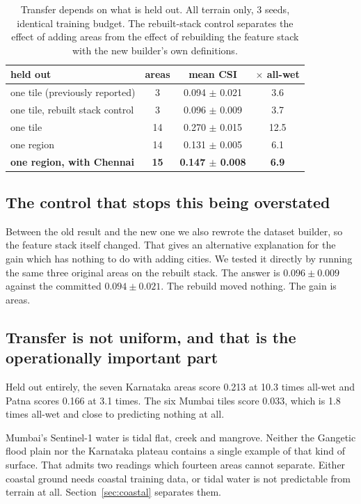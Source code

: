 \begin{table}[!t]
\centering
\caption{Transfer depends on what is held out. All terrain only, 3 seeds, identical training budget.
The rebuilt-stack control separates the effect of adding areas from the effect of rebuilding the
feature stack with the new builder's own definitions.}
\label{tab:transfer}
\begin{tabular}{lccc}
\toprule
held out & areas & mean CSI & $\times$ all-wet \\
\midrule
one tile (previously reported)  &  3 & 0.094 $\pm$ 0.021 & 3.6 \\
one tile, rebuilt stack control &  3 & 0.096 $\pm$ 0.009 & 3.7 \\
one tile                        & 14 & 0.270 $\pm$ 0.015 & 12.5 \\
one region                      & 14 & 0.131 $\pm$ 0.005 & 6.1 \\
\textbf{one region, with Chennai} & \textbf{15} & \textbf{0.147 $\pm$ 0.008} & \textbf{6.9} \\
\bottomrule
\end{tabular}
\end{table}

\subsection{The control that stops this being overstated}
Between the old result and the new one we also rewrote the dataset builder, so the feature stack
itself changed. That gives an alternative explanation for the gain which has nothing to do with
adding cities. We tested it directly by running the same three original areas on the rebuilt stack.
The answer is $0.096 \pm 0.009$ against the committed $0.094 \pm 0.021$. The rebuild moved nothing.
The gain is areas.

\subsection{Transfer is not uniform, and that is the operationally important part}
Held out entirely, the seven Karnataka areas score 0.213 at 10.3 times all-wet and Patna scores
0.166 at 3.1 times. The six Mumbai tiles score 0.033, which is 1.8 times all-wet and close to
predicting nothing at all.

Mumbai's Sentinel-1 water is tidal flat, creek and mangrove. Neither the Gangetic flood plain nor
the Karnataka plateau contains a single example of that kind of surface. That admits two readings
which fourteen areas cannot separate. Either coastal ground needs coastal training data, or tidal
water is not predictable from terrain at all. Section~\ref{sec:coastal} separates them.
